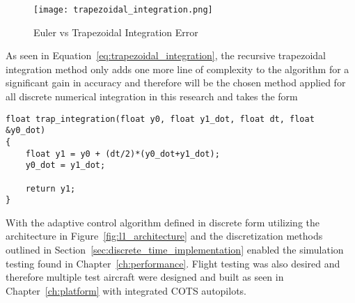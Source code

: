 \begin{figure}[h!]
 \centering
  \texttt{[image: trapezoidal\_integration.png]}
  \caption{Euler vs Trapezoidal Integration Error}
  \label{fig:trapezoidal_integration}
\end{figure}

As seen in Equation~\ref{eq:trapezoidal_integration}, the recursive trapezoidal integration method only adds one more line of complexity to the algorithm for a significant gain in accuracy and therefore will be the chosen method applied for all discrete numerical integration in this research and takes the form \newline

\begin{lstlisting}
float trap_integration(float y0, float y1_dot, float dt, float &y0_dot)
{
    float y1 = y0 + (dt/2)*(y0_dot+y1_dot);
    y0_dot = y1_dot;

    return y1;
}
\end{lstlisting}

With the \Lone adaptive control algorithm defined in discrete form utilizing the architecture in Figure~\ref{fig:l1_architecture} and the discretization methods outlined in Section~\ref{sec:discrete_time_implementation} enabled the simulation testing found in Chapter~\ref{ch:performance}.  Flight testing was also desired and therefore multiple test aircraft were designed and built as seen in Chapter~\ref{ch:platform} with integrated \ac{COTS} autopilots.











